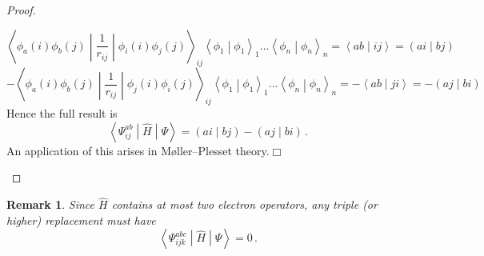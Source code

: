 \documentclass{article}
\theoremstyle{plain}\theoremheaderfont{\normalfont\itshape}\theorembodyfont{\rmfamily}\theoremseparator{.}\newtheorem*{rem}{Remark}\newtheorem*{ex}{Example}\newtheorem*{proof}{Proof}\newtheorem*{altp}{Alternative proof}
\theoremstyle{plain}\theoremheaderfont{\normalfont\bfseries}\theorembodyfont{\rmfamily}\theoremseparator{.}\newtheorem{thm}{Theorem}[section]\newtheorem{lem}[thm]{Lemma}\newtheorem{prop}[thm]{Proposition}\newtheorem*{cor}{Corollary}\newtheorem{defn}[thm]{Definition}\newtheorem{clm}[thm]{Claim}\newtheorem{clminproof}{Claim}
\theoremstyle{break}\theoremheaderfont{\normalfont\itshape}\theorembodyfont{\rmfamily}\theoremseparator{.\medskip}\newtheorem*{proofskip}{Proof}\newtheorem*{exs}{Examples}\newtheorem*{rems}{Remarks}
\theoremstyle{break}\theoremheaderfont{\normalfont\bfseries}\theorembodyfont{\rmfamily}\theoremseparator{.\medskip}\newtheorem{lemskip}[thm]{Lemma}\newtheorem{defnskip}[thm]{Definition}\newtheorem{propskip}[thm]{Proposition}\newtheorem{thmskip}[thm]{Theorem}
\numberwithin{equation}{section}
\newcommand{\qed}{\hfill\ensuremath{\Box}}
\newcommand{\braket}[2]{\left\langle #1 \middle| #2 \right\rangle}
\newcommand{\mel}[3]{\left\langle #1 \middle| #2 \middle| #3 \right\rangle}
\newcommand{\bracket}[2]{\left( #1 \middle| #2 \right)}
\begin{document}
\begin{proof}
\begin{enumerate}[topsep=0pt,label=(\roman*)]
            \begin{equation}
                \mel{\phi_a(i)\phi_b(j)}{\frac{1}{r_{ij}}}{\phi_i(i)\phi_j(j)}_{ij}\braket{\phi_1}{\phi_1}_1\dots\braket{\phi_n}{\phi_n}_n=\braket{ab}{ij}=\bracket{ai}{bj}
            \end{equation}
            \begin{equation}
                -\mel{\phi_a(i)\phi_b(j)}{\frac{1}{r_{ij}}}{\phi_j(i)\phi_i(j)}_{ij}\braket{\phi_1}{\phi_1}_1\dots\braket{\phi_n}{\phi_n}_n=-\braket{ab}{ji}=-\bracket{aj}{bi}
            \end{equation}
            Hence the full result is
            \begin{equation}
                \mel{\Psi_{ij}^{ab}}{\hat{H}}{\Psi}=\bracket{ai}{bj}-\bracket{aj}{bi}\,.
            \end{equation}
            An application of this arises in M{\o}ller--Plesset theory.\qed
        \end{enumerate}
    \end{proof}
    \begin{rem}
        Since \(\hat{H}\) contains at most two electron operators, any triple (or higher) replacement must have
        \begin{equation}
            \mel{\Psi_{ijk}^{abc}}{\hat{H}}{\Psi}=0\,.
        \end{equation}
    \end{rem}
\end{document}
